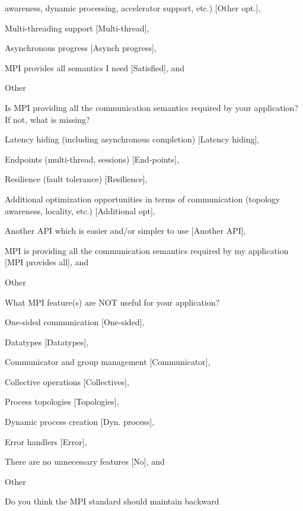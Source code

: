 \documentclass[preprint,5p,times]{elsarticle}
\begin{document}
{{\begin{description}[leftmargin=3mm]
\begin{inparaenum}[{\bf C}1)]
      awareness, dynamic processing, accelerator support, etc.) [Other opt.],
    \item Multi-threading support [Multi-thread],
    \item Asynchronous progress [Asynch progress],
    \item MPI provides all semantics I need [Satisfied], and
    \item Other
    \end{inparaenum}
  \item[Q26*:] Is MPI providing all the communication semantics required
    by your application? If not, what is missing?
    \begin{inparaenum}[{\bf C}1)]
    \item Latency hiding (including asynchronous completion) [Latency hiding],
    \item Endpoints (multi-thread, sessions) [End-points],
    \item Resilience (fault tolerance) [Resilience],
    \item Additional optimization opportunities in terms of communication
      (topology awareness, locality, etc.) [Additional opt],
    \item Another API which is easier and/or simpler to use [Another API],
    \item MPI is providing all the communication semantics required by my
      application [MPI provides all], and
    \item Other
    \end{inparaenum}
  \item[Q27*:] What MPI feature(s) are NOT useful for your application?
    \begin{inparaenum}[{\bf C}1)]
    \item One-sided communication [One-sided],
    \item Datatypes [Datatypes],
    \item Communicator and group management [Communicator],
    \item Collective operations [Collectives],
    \item Process topologies [Topologies],
    \item Dynamic process creation [Dyn. process],
    \item Error handlers [Error],
    \item There are no unnecessary features [No], and
    \item Other
    \end{inparaenum}
  \item[Q28:] Do you think the MPI standard should maintain backward

\end{description}}}
\end{document}
